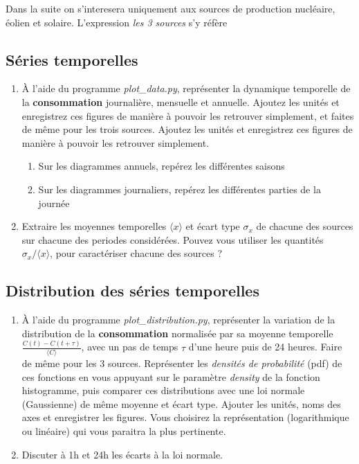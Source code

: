 \documentclass{article}
\newcommand{\tmtextbf}[1]{{\bfseries{#1}}}
\newcommand{\tmtextit}[1]{{\itshape{#1}}}
\begin{document}
Dans la suite on s'interesera uniquement aux sources de production nucléaire,
éolien et solaire. L'expression \tmtextit{les 3 sources} s'y réfère

\subsection{Séries temporelles}

\begin{enumerate}
  \item À l'aide du programme \tmtextit{plot\_data.py}, représenter la
  dynamique temporelle de la \tmtextbf{consommation} journalière, mensuelle
  et annuelle. Ajoutez les unités et enregistrez ces figures de manière à
  pouvoir les retrouver simplement, et faites de même pour les trois sources.
  Ajoutez les unités et enregistrez ces figures de manière à pouvoir les
  retrouver simplement.
  \begin{enumerate}
    \item Sur les diagrammes annuels, repérez les différentes saisons
    
    \item Sur les diagrammes journaliers, repérez les différentes parties de
    la journée
  \end{enumerate}
  \item Extraire les moyennes temporelles $\langle x \rangle$ et écart type
  $\sigma_x$ de chacune des sources sur chacune des periodes considérées.
  Pouvez vous utiliser les quantités $\sigma_x / \langle x \rangle$, pour
  caractériser chacune des sources ?
\end{enumerate}

\subsection{Distribution des séries temporelles}

\begin{enumerate}
  \item À l'aide du programme \tmtextit{plot\_distribution.py}, représenter
  la variation de la distribution de la \tmtextbf{consommation} normalisée
  par sa moyenne temporelle $\frac{C (t) - C (t + \tau)}{\langle C \rangle}$,
  avec un pas de temps $\tau$ d'une heure puis de 24 heures. Faire de même
  pour les 3 sources. Représenter les \tmtextit{densités de probabilité}
  (pdf) de ces fonctions en vous appuyant sur le paramètre \tmtextit{density}
  de la fonction histogramme, puis comparer ces distributions avec une loi
  normale (Gaussienne) de même moyenne et écart type. Ajouter les unités,
  noms des axes et enregistrer les figures. Vous choisirez la représentation
  (logarithmique ou linéaire) qui vous paraitra la plus pertinente.
  
  \item Discuter à 1h et 24h les écarts à la loi normale.
\end{enumerate}
\end{document}
